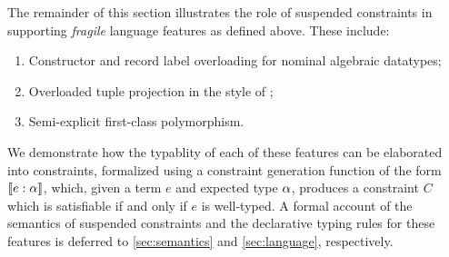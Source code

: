 \documentclass[acmsmall,screen,nonacm]{acmart}
\begin{document}

The remainder of this section illustrates the role of suspended constraints
in supporting \emph{fragile} language features as defined above.
These include:
\begin{enumerate}
  \item Constructor and record label overloading for nominal algebraic
  datatypes;
  \item Overloaded tuple projection in the style of \SML;
  \item Semi-explicit first-class polymorphism.
\end{enumerate}
We demonstrate how the typablity of each of these features can be elaborated
into constraints, formalized using a constraint generation function of the
form $\llbracket e : \alpha\rrbracket$, which, given a term $e$ and expected type $\alpha$,
produces a constraint $C$ which is satisfiable if and only if $e$ is
well-typed. A formal account of the semantics of suspended constraints and
the declarative typing rules for these features is deferred to
\cref{sec:semantics} and \cref{sec:language}, respectively.


\end{document}
